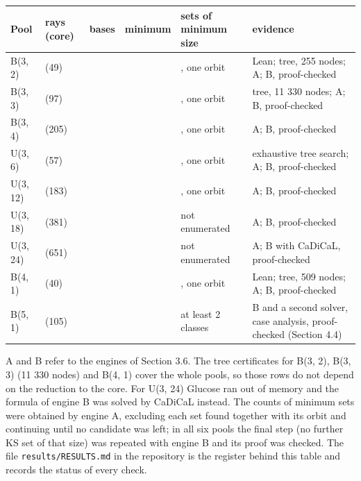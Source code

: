 \documentclass[11pt,a4paper]{article}
\begin{document}
{\def\LTcaptype{none} %
{\footnotesize
\begin{longtable}[]{@{}>{\raggedright\arraybackslash}p{}>{\raggedright\arraybackslash}p{}>{\raggedright\arraybackslash}p{}>{\raggedright\arraybackslash}p{}>{\raggedright\arraybackslash}p{}>{\raggedright\arraybackslash}p{}@{}}
\toprule\noalign{}
Pool & rays (core) & bases & minimum & sets of minimum size & evidence \\
\midrule\noalign{}
\endhead
\bottomrule\noalign{}
\endlastfoot
B(3, 2) & 49 (49) & 26 & 31 & 6, one orbit & Lean; tree, 255 nodes; A; B, proof-checked \\
B(3, 3) & 145 (97) & 50 & 31 & 6, one orbit & tree, 11 330 nodes; A; B, proof-checked \\
B(3, 4) & 289 (205) & 110 & 31 & 6, one orbit & A; B, proof-checked \\
U(3, 6) & 57 (57) & 22 & 33 & 3, one orbit & exhaustive tree search; A; B, proof-checked \\
U(3, 12) & 183 (183) & 67 & 33 & 12, one orbit & A; B, proof-checked \\
U(3, 18) & 381 (381) & 136 & 33 & not enumerated & A; B, proof-checked \\
U(3, 24) & 651 (651) & 229 & 33 & not enumerated & A; B with CaDiCaL, proof-checked \\
B(4, 1) & 40 (40) & 32 & 18 & 16, one orbit & Lean; tree, 509 nodes; A; B, proof-checked \\
B(5, 1) & 121 (105) & 136 & 29 & at least 2 classes & B and a second solver, case analysis, proof-checked (Section 4.4) \\
\end{longtable}
}
}

A and B refer to the engines of Section 3.6. The tree certificates for B(3, 2), B(3, 3) (11 330 nodes)
and B(4, 1) cover the whole pools, so those rows do not depend on the reduction to the core. For U(3, 24) Glucose ran out of memory and the
formula of engine B was solved by CaDiCaL instead. The counts of minimum sets were obtained by
engine A, excluding each set found together with its orbit and continuing until no candidate was left;
in all six pools the final step (no further KS set of that size) was repeated with engine B and its
proof was checked. The file \texttt{results/RESULTS.md} in the repository is the register behind this table
and records the status of every check.
\end{document}

